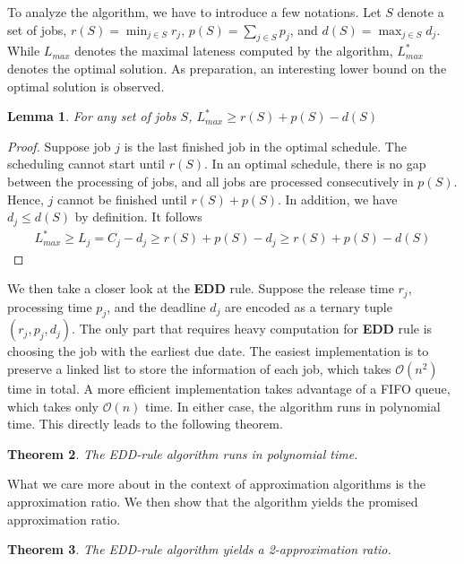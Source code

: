 \documentclass[11pt,psfig,times]{article}
\newcommand*{\bigo}[1]{\mathcal{O}(#1)}
\newtheorem{theorem}{Theorem}
\newtheorem{lemma}[theorem]{Lemma}
\begin{document}
To analyze the algorithm, we have to introduce a few notations. Let $S$ denote a set of jobs, $r(S) = \min_{j \in S} r_j$, $p(S) = \sum_{j \in S} p_j$, 
and $d(S) = \max_{j \in S} d_j$. While $L_{max}$ denotes the maximal lateness computed by the algorithm, $L_{max}^*$ denotes the optimal solution. 
As preparation, an interesting lower bound on the optimal solution is observed. 
\begin{lemma}
    \label{lemma:lowerbound}
    For any set of jobs $S$, $L_{max}^* \geq r(S) + p(S) - d(S)$
\end{lemma}
\begin{proof}
    Suppose job $j$ is the last finished job in the optimal schedule. The scheduling cannot start until $r(S)$. In an optimal schedule, there is no gap between the processing of jobs, and all jobs 
    are processed consecutively in $p(S)$. Hence, $j$ cannot be finished until $r(S) + p(S)$. In addition, we have $d_j \leq d(S)$ by definition. It follows 
    \begin{align*}
        L_{max}^* \geq L_j = C_j - d_j \geq r(S) + p(S) - d_j \geq r(S) + p(S) - d(S)
    \end{align*} 
\end{proof}
We then take a closer look at the \textbf{EDD} rule. Suppose the release time $r_j$, processing time $p_j$, and the deadline $d_j$ are encoded as a ternary tuple $(r_j, p_j, d_j)$.
The only part that requires heavy computation for \textbf{EDD} rule is choosing the job with the earliest due date.
The easiest implementation is to preserve a linked list to store the information of each job, which takes $\bigo{n^2}$ time in total. 
A more efficient implementation takes advantage of a FIFO queue, which takes only $\bigo{n}$ time. In either case, 
the algorithm runs in polynomial time. This directly leads to the following theorem.
\begin{theorem}
    The EDD-rule algorithm runs in polynomial time. 
\end{theorem}
What we care more about in the context of approximation algorithms is the approximation ratio. We then show that the algorithm yields the promised approximation ratio.
\begin{theorem}
    The EDD-rule algorithm yields a 2-approximation ratio.
\end{theorem}
\end{document}
